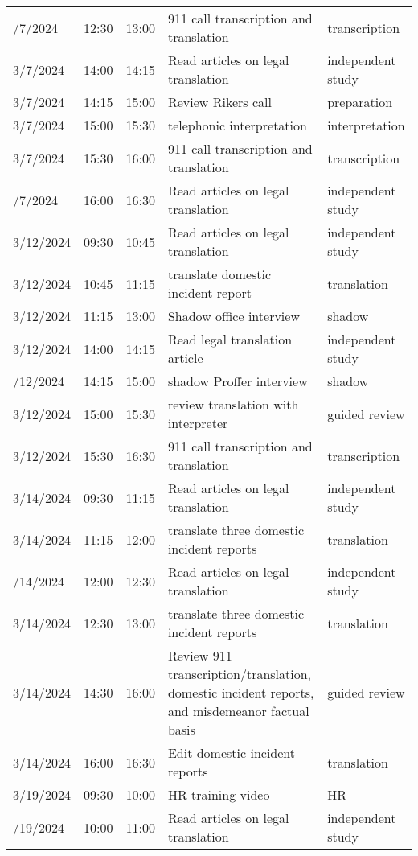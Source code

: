 \begin{table}
\begin{tabular}{lllll}
\addlinespace
3/7/2024 & 12:30 & 13:00 & 911 call transcription and translation & transcription\\
3/7/2024 & 14:00 & 14:15 & Read articles on legal translation & independent study\\
3/7/2024 & 14:15 & 15:00 & Review Rikers call & preparation\\
3/7/2024 & 15:00 & 15:30 & telephonic interpretation & interpretation\\
3/7/2024 & 15:30 & 16:00 & 911 call transcription and translation & transcription\\
\addlinespace
3/7/2024 & 16:00 & 16:30 & Read articles on legal translation & independent study\\
3/12/2024 & 09:30 & 10:45 & Read articles on legal translation & independent study\\
3/12/2024 & 10:45 & 11:15 & translate domestic incident report & translation\\
3/12/2024 & 11:15 & 13:00 & Shadow office interview & shadow\\
3/12/2024 & 14:00 & 14:15 & Read legal translation article & independent study\\
\addlinespace
3/12/2024 & 14:15 & 15:00 & shadow Proffer interview & shadow\\
3/12/2024 & 15:00 & 15:30 & review translation with interpreter & guided review\\
3/12/2024 & 15:30 & 16:30 & 911 call transcription and translation & transcription\\
3/14/2024 & 09:30 & 11:15 & Read articles on legal translation & independent study\\
3/14/2024 & 11:15 & 12:00 & translate three domestic incident reports & translation\\
\addlinespace
3/14/2024 & 12:00 & 12:30 & Read articles on legal translation & independent study\\
3/14/2024 & 12:30 & 13:00 & translate three domestic incident reports & translation\\
3/14/2024 & 14:30 & 16:00 & Review 911 transcription/translation, domestic incident reports, and misdemeanor factual basis & guided review\\
3/14/2024 & 16:00 & 16:30 & Edit domestic incident reports & translation\\
3/19/2024 & 09:30 & 10:00 & HR training video & HR\\
\addlinespace
3/19/2024 & 10:00 & 11:00 & Read articles on legal translation & independent study\\

\end{tabular}
\end{table}
